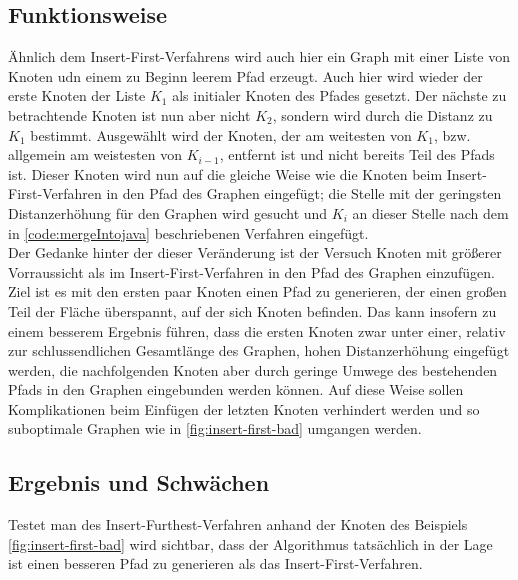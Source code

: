 \subsection{Funktionsweise} \label{sec:insert-furthest-funkt}
Ähnlich dem Insert-First-Verfahrens wird auch hier ein Graph mit einer Liste von Knoten udn einem zu Beginn leerem Pfad erzeugt.
Auch hier wird wieder der erste Knoten der Liste $K_1$ als initialer Knoten des Pfades gesetzt.
Der nächste zu betrachtende Knoten ist nun aber nicht $K_2$, sondern wird durch die Distanz zu $K_1$ bestimmt.
Ausgewählt wird der Knoten, der am weitesten von $K_1$, bzw. allgemein am weistesten von $K_{i-1}$, entfernt ist und nicht bereits Teil des Pfads ist.
Dieser Knoten wird nun auf die gleiche Weise wie die Knoten beim Insert-First-Verfahren in den Pfad des Graphen eingefügt; die Stelle mit der geringsten Distanzerhöhung für den Graphen wird gesucht und $K_i$ an dieser Stelle nach dem in \vref{code:mergeIntojava} beschriebenen Verfahren eingefügt.\\
Der Gedanke hinter der dieser Veränderung ist der Versuch Knoten mit größerer Vorraussicht als im Insert-First-Verfahren in den Pfad des Graphen einzufügen.
Ziel ist es mit den ersten paar Knoten einen Pfad zu generieren, der einen großen Teil der Fläche überspannt, auf der sich Knoten befinden.
Das kann insofern zu einem besserem Ergebnis führen, dass die ersten Knoten zwar unter einer, relativ zur schlussendlichen Gesamtlänge des Graphen, hohen Distanzerhöhung eingefügt werden, die nachfolgenden Knoten aber durch geringe Umwege des bestehenden Pfads in den Graphen eingebunden werden können.
Auf diese Weise sollen Komplikationen beim Einfügen der letzten Knoten verhindert werden und so suboptimale Graphen wie in \vref{fig:insert-first-bad} umgangen werden.

\subsection{Ergebnis und Schwächen}
Testet man des Insert-Furthest-Verfahren anhand der Knoten des Beispiels \vref{fig:insert-first-bad} wird sichtbar, dass der Algorithmus tatsächlich in der Lage ist einen besseren Pfad zu generieren als das Insert-First-Verfahren.

